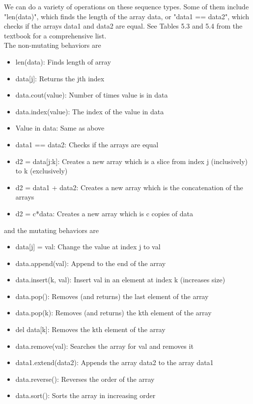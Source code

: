 \documentclass[]{article}
\begin{document}
We can do a variety of operations on these sequence types. Some of them include "len(data)", which finds the length of the array data, or "data1 == data2", which checks if the arrays data1 and data2 are equal. See Tables 5.3 and 5.4 from the textbook for a comprehensive list. \\

The non-mutating behaviors are 

\begin{itemize}
	\item len(data): Finds length of array
	\item data[j]: Returns the jth index
	\item data.cout(value): Number of times value is in data
	\item data.index(value): The index of the value in data
	\item Value in data: Same as above
	\item data1 == data2: Checks if the arrays are equal
	\item d2 = data[j:k]: Creates a new array which is a slice from index j (inclusively) to k (exclusively)
	\item d2 = data1 + data2: Creates a new array which is the concatenation of the arrays
	\item d2 = c*data: Creates a new array which is c copies of data
\end{itemize}

and the mutating behaviors are

\begin{itemize}
	\item data[j] = val: Change the value at index j to val
	\item data.append(val): Append to the end of the array
	\item data.insert(k, val): Insert val in an element at index k (increases size)
	\item data.pop(): Removes (and returns) the last element of the array
	\item data.pop(k): Removes (and returns) the kth element of the array
	\item del data[k]: Removes the kth element of the array
	\item data.remove(val): Searches the array for val and removes it
	\item data1.extend(data2): Appends the array data2 to the array data1
	\item data.reverse(): Reverses the order of the array
	\item data.sort(): Sorts the array in increasing order
\end{itemize}
\end{document}
